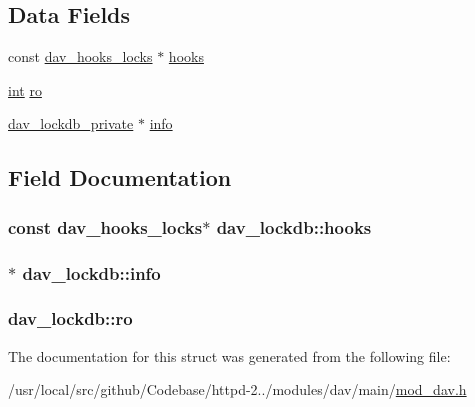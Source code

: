 \subsection*{Data Fields}
\begin{DoxyCompactItemize}
\item 
const \hyperlink{structdav__hooks__locks}{dav\+\_\+hooks\+\_\+locks} $\ast$ \hyperlink{structdav__lockdb_ae9532d8d5b0dbed0b9fe1731ab761b15}{hooks}
\item 
\hyperlink{pcre_8txt_a42dfa4ff673c82d8efe7144098fbc198}{int} \hyperlink{structdav__lockdb_a8f6ba810d0ac8d94ae4abd85cecab96b}{ro}
\item 
\hyperlink{structdav__lockdb__private}{dav\+\_\+lockdb\+\_\+private} $\ast$ \hyperlink{structdav__lockdb_a850f3e67cbaf595898a075a078a8a693}{info}
\end{DoxyCompactItemize}


\subsection{Field Documentation}
\subsubsection[{\texorpdfstring{hooks}{hooks}}]{\setlength{\rightskip}{0pt plus 5cm}const {\bf dav\+\_\+hooks\+\_\+locks}$\ast$ dav\+\_\+lockdb\+::hooks}\hypertarget{structdav__lockdb_ae9532d8d5b0dbed0b9fe1731ab761b15}{}\label{structdav__lockdb_ae9532d8d5b0dbed0b9fe1731ab761b15}
\subsubsection[{\texorpdfstring{info}{info}}]{$\ast$ dav\+\_\+lockdb\+::info}\hypertarget{structdav__lockdb_a850f3e67cbaf595898a075a078a8a693}{}\label{structdav__lockdb_a850f3e67cbaf595898a075a078a8a693}
\subsubsection[{\texorpdfstring{ro}{ro}}]{ dav\+\_\+lockdb\+::ro}\hypertarget{structdav__lockdb_a8f6ba810d0ac8d94ae4abd85cecab96b}{}\label{structdav__lockdb_a8f6ba810d0ac8d94ae4abd85cecab96b}


The documentation for this struct was generated from the following file\+:\begin{DoxyCompactItemize}
\item 
/usr/local/src/github/\+Codebase/httpd-\/2../modules/dav/main/\hyperlink{mod__dav_8h}{mod\+\_\+dav.\+h}\end{DoxyCompactItemize}
